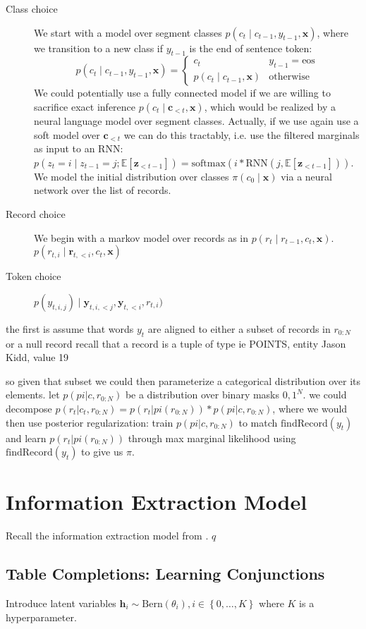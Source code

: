 \documentclass{article}
\newcommand\set[1]{\left\{#1\right\}}
\newcommand\Bern{\mathrm{Bern}}
\newcommand\E[1]{\mathbb{E}\left[#1\right]}
\newcommand{\bc}{\mathbf{c}}
\newcommand{\bh}{\mathbf{h}}
\newcommand{\br}{\mathbf{r}}
\newcommand{\bx}{\mathbf{x}}
\newcommand{\by}{\mathbf{y}}
\newcommand{\bz}{\mathbf{z}}
\begin{document}
\begin{description}
\item[Class choice]
We start with a model over segment classes $p(c_t\mid c_{t-1},y_{t-1},\bx)$,
where we transition to a new class if $y_{t-1}$ is the end of sentence token:
$$p(c_t\mid c_{t-1},y_{t-1},\bx) = \begin{cases}
c_t & y_{t-1}=\textrm{eos}\\
p(c_t\mid c_{t-1},\bx) & \textrm{otherwise}
\end{cases}$$
We could potentially use a fully connected model if we are willing to sacrifice
exact inference $p(c_t\mid \bc_{<t}, \bx)$, which would be realized by a neural
language model over segment classes.
Actually, if we use again use a soft model over $\bc_{<t}$ we can do this tractably,
i.e. use the filtered marginals as input to an RNN:
$p(z_t=i\mid z_{t-1}=j; \E{\bz_{<t-1}}) = \textrm{softmax}(i * \textrm{RNN}(j, \E{\bz_{<t-1}}))$.
We model the initial distribution over classes $\pi(c_0\mid\bx)$
via a neural network over the list of records.
\item[Record choice]
We begin with a markov model over records as in \citet{liang2009semalign} $p(r_t\mid r_{t-1},c_t,\bx)$.
$p(r_{t,i}\mid\br_{t,<i},c_t,\bx)$
\item[Token choice]
$p(y_{t,i,j})\mid\by_{t,i,<j},\by_{t,<i},r_{t,i})$
\end{description}
the first is assume that words $y_t$ are aligned to either a subset of records in $r_{0:N}$ or a null record
recall that a record is a tuple of type {ie POINTS}, entity {Jason Kidd}, value {19}

so given that subset we could then parameterize a categorical distribution over its elements.
let $p(pi | c, r_{0:N})$ be a distribution over binary masks ${0,1}^N$. 
we could decompose $p(r_t | c_t, r_{0:N}) = p(r_t | pi(r_{0:N})) * p(pi | c, r_{0:N})$,
where we would then use posterior regularization: train $p(pi | c, r_{0:N})$ to match
$\textrm{findRecord}(y_t)$ and learn
$p(r_t | pi(r_{0:N}))$ through max marginal likelihood using $\textrm{findRecord}(y_t)$ to give us $\pi$.

\section{Information Extraction Model}
Recall the information extraction model from \citet{wiseman2017d2t}.
$q$

\subsection{Table Completions: Learning Conjunctions}
Introduce latent variables $\bh_i\sim\Bern(\theta_i),i\in\set{0,\ldots,K}$
where $K$ is a hyperparameter. 
\end{document}
